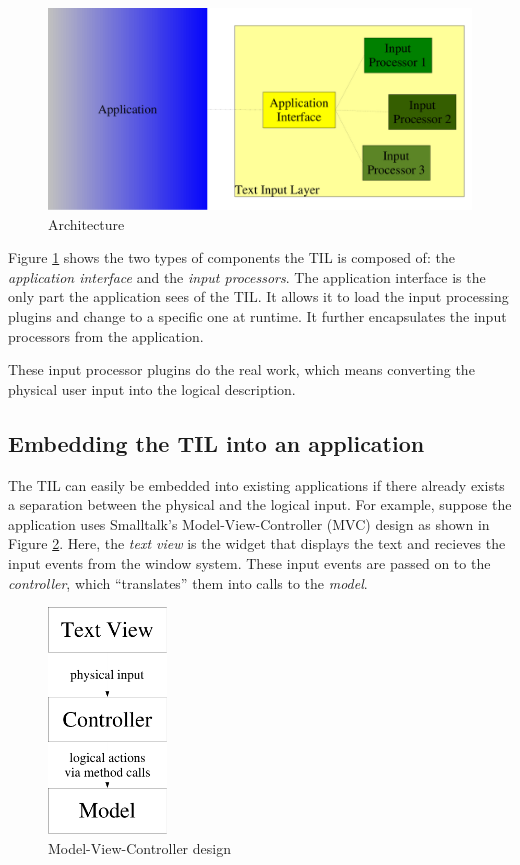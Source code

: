\documentclass[a4paper]{article}
\begin{document}
\begin{figure}[ht]

\includegraphics[width=\textwidth]{architecture}

\caption{Architecture}
\label{fg:architecture}
\end{figure}

Figure \ref{fg:architecture} shows the two types of components the TIL is composed of: the \emph{application interface} and the \emph{input processors}. The application interface is the only part the application sees of the TIL. It allows it to load the input processing plugins and change to a specific one at runtime. It further encapsulates the input processors from the application.

These input processor plugins do the real work, which means converting the physical user input into the logical description.

\subsection{Embedding the TIL into an application}

The TIL can easily be embedded into existing applications if there already exists a separation between the physical and the logical input. For example, suppose the application uses Smalltalk's Model-View-Controller (MVC) design as shown in Figure \ref{fg:mvc}. Here, the \emph{text view} is the widget that displays the text and recieves the input events from the window system. These input events are passed on to the \emph{controller}, which ``translates'' them into calls to the \emph{model}.

\begin{figure}[ht]
\centering

\includegraphics[height=6cm]{mvc}

\caption{Model-View-Controller design}
\label{fg:mvc}
\end{figure}
\end{document}
